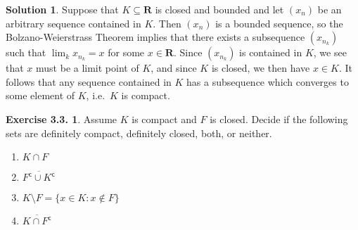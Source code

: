 \documentclass[12pt]{article}
\theoremstyle{definition}
\theoremstyle{exercise}
\newtheorem{exercise}{Exercise 3.3.}
\theoremstyle{solution}
\newtheorem*{solution}{Solution}
\newcommand{\setcomp}[1]{#1^{\mathsf{c}}}
\newcommand{\R}{\mathbf{R}}
\begin{document}
\begin{solution}
    Suppose that \( K \subseteq \R \) is closed and bounded and let \( (x_n) \) be an arbitrary sequence contained in \( K \). Then \( (x_n) \) is a bounded sequence, so the Bolzano-Weierstrass Theorem implies that there exists a subsequence \( (x_{n_k}) \) such that \( \lim_k x_{n_k} = x \) for some \( x \in \R \). Since \( (x_{n_k}) \) is contained in \( K \), we see that \( x \) must be a limit point of \( K \), and since \( K \) is closed, we then have \( x \in K \). It follows that any sequence contained in \( K \) has a subsequence which converges to some element of \( K \), i.e.\ \( K \) is compact.
\end{solution}

\begin{exercise}
\label{ex:4}
    Assume \( K \) is compact and \( F \) is closed. Decide if the following sets are definitely compact, definitely closed, both, or neither.
    \begin{enumerate}
        \item \( K \cap F \)

        \item \( \overline{\setcomp{F} \cup \setcomp{K}} \)

        \item \( K \setminus F = \{ x \in K : x \not\in F \} \)

        \item \( \overline{K \cap \setcomp{F}} \)
    \end{enumerate}
\end{exercise}
\end{document}
